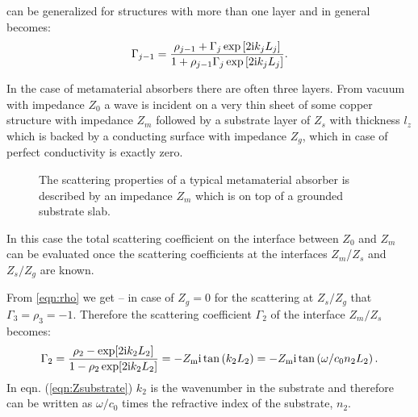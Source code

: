  can be generalized for structures with more than one layer and in general becomes:
\begin{equation}
\Gamma_{j-1} = \frac{\rho_{j-1}+\Gamma_j \exp\left[2\mathrm{i} k_j L_j\right]}
{1+\rho_{j-1}\Gamma_j \exp\left[2\mathrm{i} k_j L_j\right]}.
\label{eqn:NlayerGamma}
\end{equation}

In the case of metamaterial absorbers there are often three layers. From vacuum with impedance $Z_0$ a wave is incident on a very thin sheet of some copper structure with impedance $Z_m$ followed by a substrate layer of $Z_s$ with thickness $l_z$ which is backed by a conducting surface with impedance $Z_g$, which in case of perfect conductivity is exactly zero.

\begin{figure}
\centering
{}
\caption{The scattering properties of a typical metamaterial absorber is described by an impedance $Z_m$ which is on top of a grounded substrate slab.}
\label{fig:Nstacked_structure}
\end{figure}

In this case the total scattering coefficient on the interface between $Z_0$ and $Z_m$ can be evaluated once the scattering coefficients at the interfaces $Z_m$/$Z_s$ and $Z_s/Z_g$ are known.

From \cref{eqn:rho} we get -- in case of $Z_g=0$ for the scattering at $Z_s/Z_g$ that $\Gamma_3=\rho_3=-1$. Therefore the scattering coefficient $\Gamma_2$ of the interface $Z_m/Z_s$ becomes:
\begin{equation}
\Gamma_2 = \frac{\rho_2- \exp[2\mathrm{i} k_2 L_2]}
			    {1-\rho_2\exp[2\mathrm{i} k_2 L_2]}
	    =-Z_\mathrm{m}\mathrm{i} \tan\left(k_2 L_2\right)
	    =-Z_\mathrm{m}\mathrm{i} \tan\left(\omega/c_0 n_2 L_2\right).
\label{eqn:Zsubstrate}
\end{equation}
In eqn. (\ref{eqn:Zsubstrate}) $k_2$ is the wavenumber in the substrate and therefore can be written as $\omega/c_0$ times the refractive index of the substrate, $n_2$.


